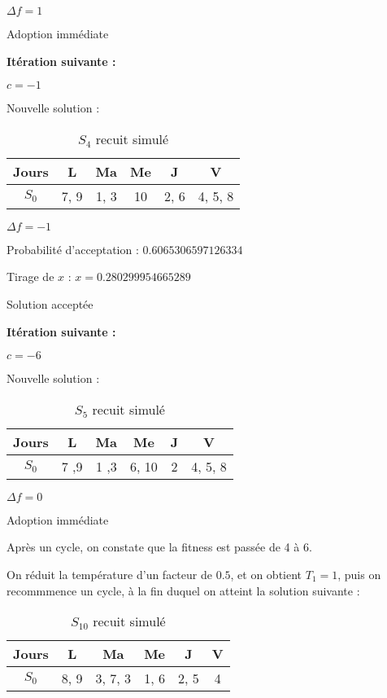 {    $\Delta f = 1$

    Adoption immédiate

    \textbf{Itération suivante :}

    $c = -1$

    Nouvelle solution :

    \begin{table}[!h]
        \centering
        \begin{tabular}{|c|c|c|c|c|c|}
            \hline
            Jours & L    & Ma   & Me & J    & V       \\
            \hline
            $S_0$ & 7, 9 & 1, 3 & 10 & 2, 6 & 4, 5, 8 \\
            \hline
        \end{tabular}\caption{$S_4$ recuit simulé}
    \end{table}

    $\Delta f = -1$

    Probabilité d'acceptation : $0.6065306597126334$

    Tirage de $x$ :
    $x = 0.280299954665289$

    Solution acceptée

    \textbf{Itération suivante :}

    $c = -6$

    Nouvelle solution :

    \begin{table}[!h]
        \centering
        \begin{tabular}{|c|c|c|c|c|c|}
            \hline
            Jours & L    & Ma   & Me    & J & V       \\
            \hline
            $S_0$ & 7 ,9 & 1 ,3 & 6, 10 & 2 & 4, 5, 8 \\
            \hline
        \end{tabular}\caption{$S_5$ recuit simulé}
    \end{table}

    $\Delta f = 0$

    Adoption immédiate

    Après un cycle, on constate que la fitness est passée de 4 à 6.

On réduit la température d'un facteur de $0.5$, et on obtient $T_1 = 1$, puis on recommmence un cycle, à la fin duquel on atteint la solution suivante :

    \begin{table}[!h]
        \centering
        \begin{tabular}{|c|c|c|c|c|c|}
            \hline
            Jours & L    & Ma      & Me   & J    & V \\
            \hline
            $S_0$ & 8, 9 & 3, 7, 3 & 1, 6 & 2, 5 & 4 \\
            \hline
        \end{tabular}\caption{$S_{10}$ recuit simulé}
    \end{table}

}
